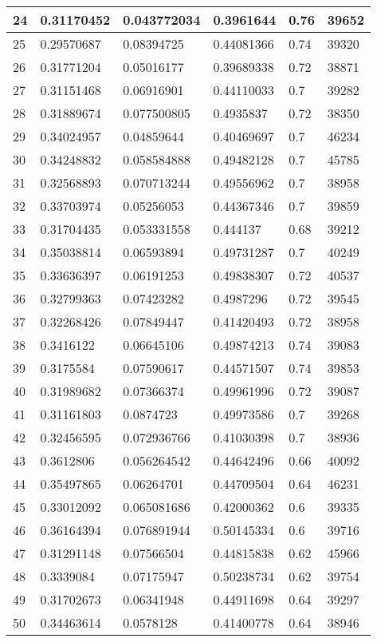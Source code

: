 \begin{longtable}{|l|l|l|l|l|l|}
24 & 0.31170452 & 0.043772034 & 0.3961644 & 0.76 & 39652 \\ \hline 
25 & 0.29570687 & 0.08394725 & 0.44081366 & 0.74 & 39320 \\ \hline 
26 & 0.31771204 & 0.05016177 & 0.39689338 & 0.72 & 38871 \\ \hline 
27 & 0.31151468 & 0.06916901 & 0.44110033 & 0.7 & 39282 \\ \hline 
28 & 0.31889674 & 0.077500805 & 0.4935837 & 0.72 & 38350 \\ \hline 
29 & 0.34024957 & 0.04859644 & 0.40469697 & 0.7 & 46234 \\ \hline 
30 & 0.34248832 & 0.058584888 & 0.49482128 & 0.7 & 45785 \\ \hline 
31 & 0.32568893 & 0.070713244 & 0.49556962 & 0.7 & 38958 \\ \hline 
32 & 0.33703974 & 0.05256053 & 0.44367346 & 0.7 & 39859 \\ \hline 
33 & 0.31704435 & 0.053331558 & 0.444137 & 0.68 & 39212 \\ \hline 
34 & 0.35038814 & 0.06593894 & 0.49731287 & 0.7 & 40249 \\ \hline 
35 & 0.33636397 & 0.06191253 & 0.49838307 & 0.72 & 40537 \\ \hline 
36 & 0.32799363 & 0.07423282 & 0.4987296 & 0.72 & 39545 \\ \hline 
37 & 0.32268426 & 0.07849447 & 0.41420493 & 0.72 & 38958 \\ \hline 
38 & 0.3416122 & 0.06645106 & 0.49874213 & 0.74 & 39083 \\ \hline 
39 & 0.3175584 & 0.07590617 & 0.44571507 & 0.74 & 39853 \\ \hline 
40 & 0.31989682 & 0.07366374 & 0.49961996 & 0.72 & 39087 \\ \hline 
41 & 0.31161803 & 0.0874723 & 0.49973586 & 0.7 & 39268 \\ \hline 
42 & 0.32456595 & 0.072936766 & 0.41030398 & 0.7 & 38936 \\ \hline 
43 & 0.3612806 & 0.056264542 & 0.44642496 & 0.66 & 40092 \\ \hline 
44 & 0.35497865 & 0.06264701 & 0.44709504 & 0.64 & 46231 \\ \hline 
45 & 0.33012092 & 0.065081686 & 0.42000362 & 0.6 & 39335 \\ \hline 
46 & 0.36164394 & 0.076891944 & 0.50145334 & 0.6 & 39716 \\ \hline 
47 & 0.31291148 & 0.07566504 & 0.44815838 & 0.62 & 45966 \\ \hline 
48 & 0.3339084 & 0.07175947 & 0.50238734 & 0.62 & 39754 \\ \hline 
49 & 0.31702673 & 0.06341948 & 0.44911698 & 0.64 & 39297 \\ \hline 
50 & 0.34463614 & 0.0578128 & 0.41400778 & 0.64 & 38946 \\ \hline 
\end{longtable}